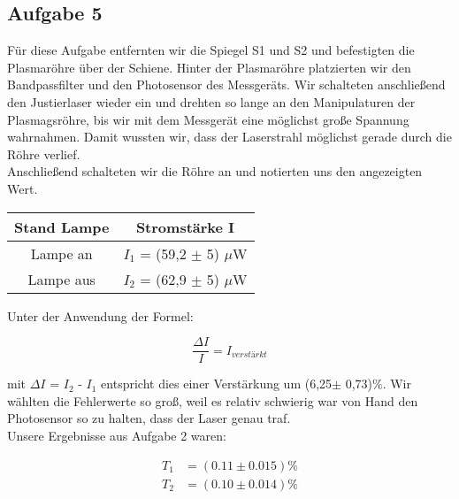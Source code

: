 \subsection{Aufgabe 5}

Für diese Aufgabe entfernten wir die Spiegel S1 und S2 und befestigten die Plasmaröhre über der Schiene. Hinter der Plasmaröhre platzierten wir den Bandpassfilter und den Photosensor des Messgeräts. Wir schalteten anschließend den Justierlaser wieder ein und drehten so lange an den Manipulaturen der Plasmagsröhre, bis wir mit dem Messgerät eine möglichst große Spannung wahrnahmen. Damit wussten wir, dass der Laserstrahl möglichst gerade durch die Röhre verlief.\\
Anschließend schalteten wir die Röhre an und notierten uns den angezeigten Wert.\\

\begin{center}
\begin{tabular}{c | c}
Stand Lampe & Stromstärke I\\
\hline
Lampe an & $I_1$ = (59,2 $\pm$ 5) $\mu$W\\
Lampe aus & $I_2$ = (62,9 $\pm$ 5) $\mu$W

\end{tabular}
\end{center}

Unter der Anwendung der Formel:

\begin{equation}
\frac{\Delta I}{I} = I_{verstärkt}
\end{equation}

mit $\Delta I$ = $I_2$ - $I_1$ entspricht dies einer Verstärkung um (6,25$\pm$ 0,73)$\%$. Wir wählten die Fehlerwerte so groß, weil es relativ schwierig war von Hand den Photosensor so zu halten, dass der Laser genau traf.\\
Unsere Ergebnisse aus Aufgabe 2 waren:

\begin{align*}
	T_{1} &= (0.11 \pm 0.015)\% \\
	T_{2} &= (0.10 \pm 0.014)\% 
\end{align*}
